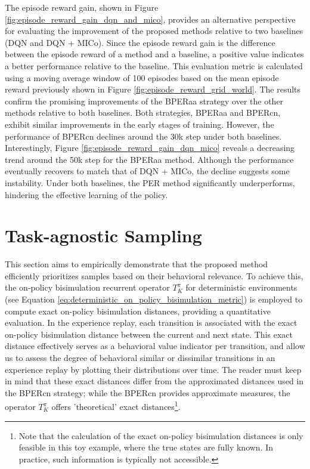The episode reward gain, shown in Figure \ref{fig:episode_reward_gain_dqn_and_mico}, provides an alternative perspective for evaluating the improvement of the proposed methods relative to two baselines (DQN and DQN + MICo). Since the episode reward gain is the difference between the episode reward of a method and a baseline, a positive value indicates a better performance relative to the baseline. This evaluation metric is calculated using a moving average window of 100 episodes based on the mean episode reward previously shown in Figure \ref{fig:episode_reward_grid_world}. The results confirm the promising improvements of the BPERaa strategy over the other methods relative to both baselines. Both strategies, BPERaa and BPERcn, exhibit similar improvements in the early stages of training. However, the performance of BPERcn declines around the 30k step under both baselines. Interestingly, Figure \ref{fig:episode_reward_gain_dqn_mico} reveals a decreasing trend around the 50k step for the BPERaa method. Although the performance eventually recovers to match that of DQN + MICo, the decline suggests some instability. Under both baselines, the PER method significantly underperforms, hindering the effective learning of the policy.



\section{Task-agnostic Sampling}

This section aims to empirically demonstrate that the proposed method efficiently prioritizes samples based on their behavioral relevance. To achieve this, the on-policy bisimulation recurrent operator $T_K^\pi$ for deterministic environments (see Equation \ref{eq:deterministic_on_policy_bisimulation_metric}) is employed to compute exact on-policy bisimulation distances, providing a quantitative evaluation. In the experience replay, each transition is associated with the exact on-policy bisimulation distance between the current and next state. This exact distance effectively serves as a behavioral value indicator per transition, and allow us to assess the degree of behavioral similar or dissimilar transitions in an experience replay by plotting their distributions over time. The reader must keep in mind that these exact distances differ from the approximated distances used in the BPERcn strategy; while the BPERcn provides approximate measures, the operator $T_K^\pi$ offers 'theoretical' exact distances\footnote{Note that the calculation of the exact on-policy bisimulation distances is only feasible in this toy example, where the true states are fully known. In practice, such information is typically not accessible.}.

